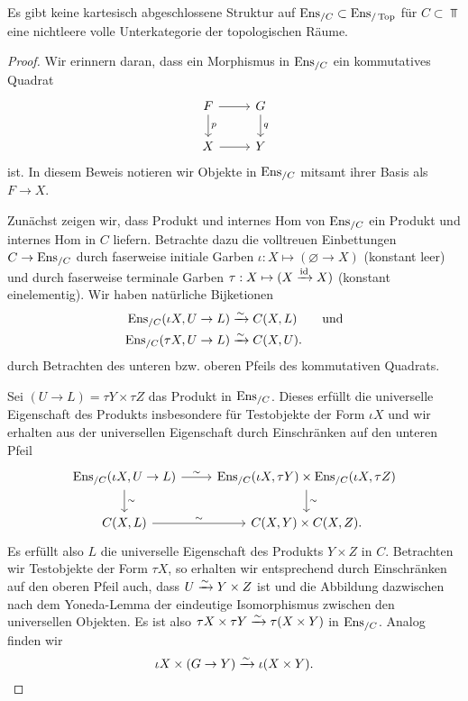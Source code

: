 \begin{satz}
  Es gibt keine kartesisch abgeschlossene Struktur auf
  $\operatorname{Ens}_{/C} \subset \operatorname{Ens}_{/\operatorname{Top}}$ für $C \subset \Top$ eine
  nichtleere volle Unterkategorie der topologischen Räume.
\end{satz}
\begin{proof}
  Wir erinnern daran, dass ein Morphismus in $\operatorname{Ens}_{/C}$ ein
  kommutatives Quadrat
  \[ \begin{tikzcd}
    F \arrow[r] \arrow{d}{p} & G \arrow{d}{q} \\
    X \arrow[r] & Y
  \end{tikzcd} \]
  ist. In diesem Beweis notieren wir Objekte in $\operatorname{Ens}_{/C}$ mitsamt
  ihrer Basis als $F \to X$.
  
  Zunächst zeigen wir, dass Produkt und internes Hom von $\operatorname{Ens}_{/C}$
  ein Produkt und internes Hom in $C$ liefern. Betrachte dazu die
  volltreuen Einbettungen $C \to \operatorname{Ens}_{/C}$ durch faserweise initiale
  Garben $\iota: X \mapsto (\varnothing \to X)$ (konstant leer) und
  durch faserweise terminale Garben $\tau: X \mapsto (X
  \xrightarrow{\operatorname{id}} X)$ (konstant einelementig). Wir haben natürliche
  Bijketionen
  \begin{align*}
    \operatorname{Ens}_{/C}(\iota X, U \to L) &\xrightarrow[]{\sim} C(X, L) \qquad \text{und} \\
    \operatorname{Ens}_{/C}(\tau X, U \to L) &\xrightarrow[]{\sim} C(X, U).
  \end{align*}
  durch Betrachten des unteren bzw. oberen Pfeils des kommutativen
  Quadrats.

  Sei $(U \to L) = \tau Y \times \tau Z$ das Produkt in
  $\operatorname{Ens}_{/C}$. Dieses erfüllt die universelle Eigenschaft des Produkts
  insbesondere für Testobjekte der Form $\iota X$ und wir erhalten aus
  der universellen Eigenschaft durch Einschränken auf den unteren
  Pfeil
  \[ \begin{tikzcd}
    \Ens_{/C}(\iota X, U \to L) \arrow{r}{\sim}
    \arrow{d}{\sim}
    & \Ens_{/C}(\iota X, \tau Y) \times \Ens_{/C}(\iota X, \tau Z)
    \arrow{d}{\sim} \\
    C(X, L) \arrow{r}{\sim}
    & C(X, Y) \times C(X, Z).
  \end{tikzcd} \]
  Es erfüllt also $L$ die universelle Eigenschaft des Produkts $Y
  \times Z$ in $C$.  Betrachten wir Testobjekte der Form $\tau X$, so
  erhalten wir entsprechend durch Einschränken auf den oberen Pfeil
  auch, dass $U \xrightarrow[]{\sim} Y \times Z$ ist und die Abbildung dazwischen nach
  dem Yoneda-Lemma der eindeutige Isomorphismus zwischen den
  universellen Objekten. Es ist also $\tau X \times \tau Y \xrightarrow[]{\sim} \tau
  (X \times Y)$ in $\operatorname{Ens}_{/C}$. Analog finden wir
  \begin{equation} \label{eq:iota-prod}
    \iota X \times (G \to Y) \xrightarrow[]{\sim} \iota (X \times Y).
  \end{equation}
  

\end{proof}
